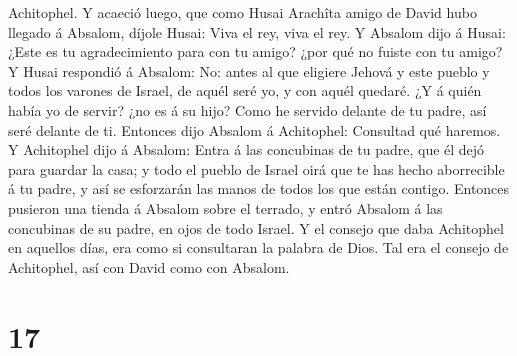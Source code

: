 Achitophel.  Y acaeció luego, que como Husai Arachîta
amigo de David hubo llegado á Absalom, díjole Husai: Viva el rey, viva
el rey.  Y Absalom dijo á Husai: ¿Este es tu
agradecimiento para con tu amigo? ¿por qué no fuiste con tu amigo?
 Y Husai respondió á Absalom: No: antes al que eligiere
Jehová y este pueblo y todos los varones de Israel, de aquél seré yo, y
con aquél quedaré.  ¿Y á quién había yo de servir? ¿no es
á su hijo? Como he servido delante de tu padre, así seré delante de ti.
 Entonces dijo Absalom á Achitophel: Consultad qué
haremos.  Y Achitophel dijo á Absalom: Entra á las
concubinas de tu padre, que él dejó para guardar la casa; y todo el
pueblo de Israel oirá que te has hecho aborrecible á tu padre, y así se
esforzarán las manos de todos los que están contigo. 
Entonces pusieron una tienda á Absalom sobre el terrado, y entró Absalom
á las concubinas de su padre, en ojos de todo Israel.  Y
el consejo que daba Achitophel en aquellos días, era como si consultaran
la palabra de Dios. Tal era el consejo de Achitophel, así con David como
con Absalom.

\hypertarget{section-16}{%
\section{17}\label{section-16}}

